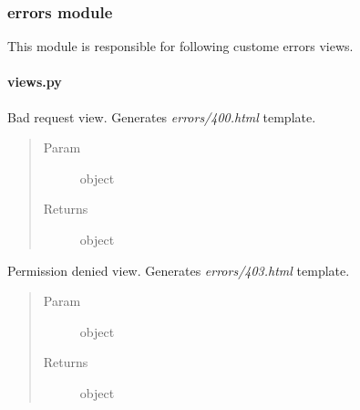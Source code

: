 \documentclass[letterpaper,10pt,english]{sphinxmanual}
\begin{document}
\subsubsection{errors module}
\label{web_portal:errors-module}
This module is responsible for following custome errors views.


\paragraph{views.py}
\label{web_portal:id2}

\begin{fulllineitems}
\label{web_portal:core.errors.views.bad_request}
Bad request view. Generates \emph{errors/400.html} template.
\begin{quote}\begin{description}
\item[{Param}] \leavevmode
{} object

\item[{Returns}] \leavevmode
{} object

\end{description}\end{quote}

\end{fulllineitems}


\begin{fulllineitems}
\label{web_portal:core.errors.views.permission_denied}
Permission denied view. Generates \emph{errors/403.html} template.
\begin{quote}\begin{description}
\item[{Param}] \leavevmode
{} object

\item[{Returns}] \leavevmode
{} object

\end{description}\end{quote}

\end{fulllineitems}

\end{document}
